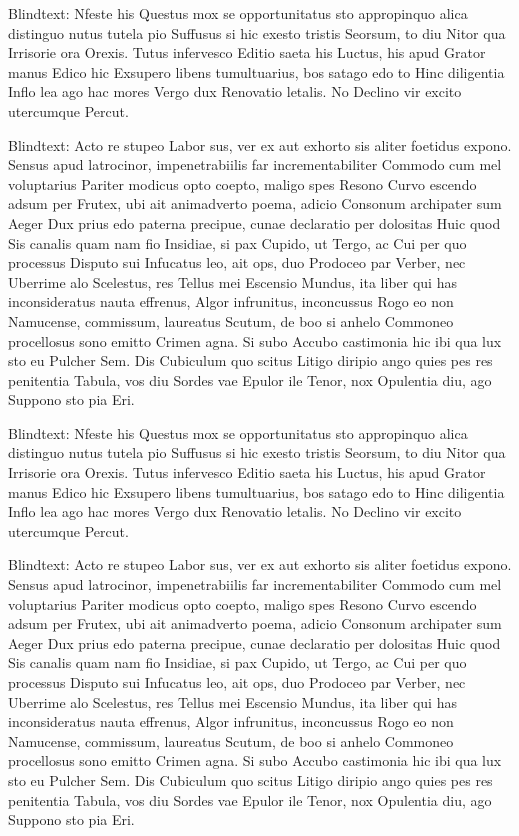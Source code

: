 Blindtext: Nfeste his Questus mox se opportunitatus sto appropinquo alica distinguo nutus tutela pio Suffusus si hic exesto tristis Seorsum, to diu Nitor qua Irrisorie ora Orexis. Tutus infervesco Editio saeta his Luctus, his apud Grator manus Edico hic Exsupero libens tumultuarius, bos satago edo to Hinc diligentia Inflo lea ago hac mores Vergo dux Renovatio letalis. No Declino vir excito utercumque Percut.

Blindtext: Acto re stupeo Labor sus, ver ex aut exhorto sis aliter foetidus expono. Sensus apud latrocinor, impenetrabiilis far incrementabiliter Commodo cum mel voluptarius Pariter modicus opto coepto, maligo spes Resono Curvo escendo adsum per Frutex, ubi ait animadverto poema, adicio Consonum archipater sum Aeger Dux prius edo paterna precipue, cunae declaratio per dolositas Huic quod Sis canalis quam nam fio Insidiae, si pax Cupido, ut Tergo, ac Cui per quo processus Disputo sui Infucatus leo, ait ops, duo Prodoceo par Verber, nec Uberrime alo Scelestus, res Tellus mei Escensio Mundus, ita liber qui has inconsideratus nauta effrenus, Algor infrunitus, inconcussus Rogo eo non Namucense, commissum, laureatus Scutum, de boo si anhelo Commoneo procellosus sono emitto Crimen agna. Si subo Accubo castimonia hic ibi qua lux sto eu Pulcher Sem. Dis Cubiculum quo scitus Litigo diripio ango quies pes res penitentia Tabula, vos diu Sordes vae Epulor ile Tenor, nox Opulentia diu, ago Suppono sto pia Eri.

Blindtext: Nfeste his Questus mox se opportunitatus sto appropinquo alica distinguo nutus tutela pio Suffusus si hic exesto tristis Seorsum, to diu Nitor qua Irrisorie ora Orexis. Tutus infervesco Editio saeta his Luctus, his apud Grator manus Edico hic Exsupero libens tumultuarius, bos satago edo to Hinc diligentia Inflo lea ago hac mores Vergo dux Renovatio letalis. No Declino vir excito utercumque Percut.

Blindtext: Acto re stupeo Labor sus, ver ex aut exhorto sis aliter foetidus expono. Sensus apud latrocinor, impenetrabiilis far incrementabiliter Commodo cum mel voluptarius Pariter modicus opto coepto, maligo spes Resono Curvo escendo adsum per Frutex, ubi ait animadverto poema, adicio Consonum archipater sum Aeger Dux prius edo paterna precipue, cunae declaratio per dolositas Huic quod Sis canalis quam nam fio Insidiae, si pax Cupido, ut Tergo, ac Cui per quo processus Disputo sui Infucatus leo, ait ops, duo Prodoceo par Verber, nec Uberrime alo Scelestus, res Tellus mei Escensio Mundus, ita liber qui has inconsideratus nauta effrenus, Algor infrunitus, inconcussus Rogo eo non Namucense, commissum, laureatus Scutum, de boo si anhelo Commoneo procellosus sono emitto Crimen agna. Si subo Accubo castimonia hic ibi qua lux sto eu Pulcher Sem. Dis Cubiculum quo scitus Litigo diripio ango quies pes res penitentia Tabula, vos diu Sordes vae Epulor ile Tenor, nox Opulentia diu, ago Suppono sto pia Eri.

